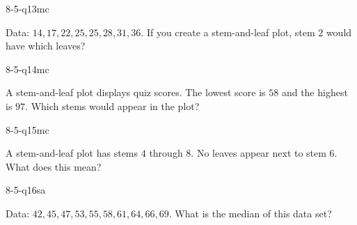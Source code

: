 \begin{practiceQuestion}{8-5-q13}{mc}
\begin{questionText}
Data: $14, 17, 22, 25, 25, 28, 31, 36$. If you create a stem-and-leaf plot, stem $2$ would have which leaves?
\end{questionText}
\end{practiceQuestion}

\begin{practiceQuestion}{8-5-q14}{mc}
\begin{questionText}
A stem-and-leaf plot displays quiz scores. The lowest score is $58$ and the highest is $97$. Which stems would appear in the plot?
\end{questionText}
\end{practiceQuestion}

\begin{practiceQuestion}{8-5-q15}{mc}
\begin{questionText}
A stem-and-leaf plot has stems $4$ through $8$. No leaves appear next to stem $6$. What does this mean?
\end{questionText}
\end{practiceQuestion}


\begin{practiceQuestion}{8-5-q16}{sa}
\begin{questionText}
Data: $42, 45, 47, 53, 55, 58, 61, 64, 66, 69$. What is the median of this data set?
\end{questionText}
\end{practiceQuestion}

